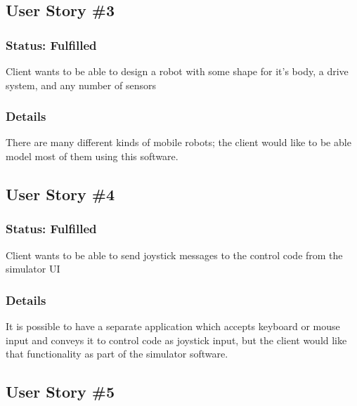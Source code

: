 \subsection{User Story \#3\label{us:3}} 
\subsubsection*{Status: Fulfilled}
Client wants to be able to design a robot with some shape for it's body, a drive system, and any number of sensors

\subsubsection*{Details}
There are many different kinds of mobile robots; the client would like to be able model most of them using this software.

\subsection{User Story \#4\label{us:4}} 
\subsubsection*{Status: Fulfilled}
Client wants to be able to send joystick messages to the control code from the simulator UI

\subsubsection*{Details}
It is possible to have a separate application which accepts keyboard or mouse input and conveys it to control code as joystick input, but the client would like that functionality as part of the simulator software.

\subsection{User Story \#5\label{us:5}}

